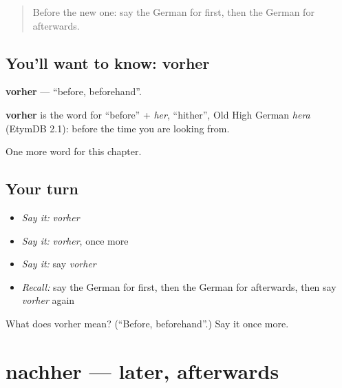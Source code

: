 \label{lesson:GE-C171-vorher}



\begin{quote}
Before the new one: say the German for first, then the German for afterwards.
\end{quote}

\subsection*{You'll want to know: vorher}
\textbf{vorher} — \textquotedblleft{}before, beforehand\textquotedblright{}.

\begin{cousinweb}
\textbf{vorher} is the word for \textquotedblleft{}before\textquotedblright{} + \emph{her}, \textquotedblleft{}hither\textquotedblright{}, Old High German \emph{hera} (EtymDB 2.1): before the time you are looking from.
\end{cousinweb}

\begin{grammarlens}[title={What you've built}]
One more word for this chapter.
\end{grammarlens}

\subsection*{Your turn}
\begin{itemize}
\raggedright
  \item \emph{Say it:} \emph{vorher}
  \item \emph{Say it:} \emph{vorher}, once more
  \item \emph{Say it:} say \emph{vorher}
  \item \emph{Recall:} say the German for first, then the German for afterwards, then say \emph{vorher} again
\end{itemize}

\begin{tcolorbox}[breakable,colback=teal!4,colframe=teal!35!black,title={Before you move on}]
What does vorher mean? (\textquotedblleft{}Before, beforehand\textquotedblright{}.) Say it once more.
\end{tcolorbox}
\section[nachher]{nachher — later, afterwards}

\label{lesson:GE-C171-nachher}



